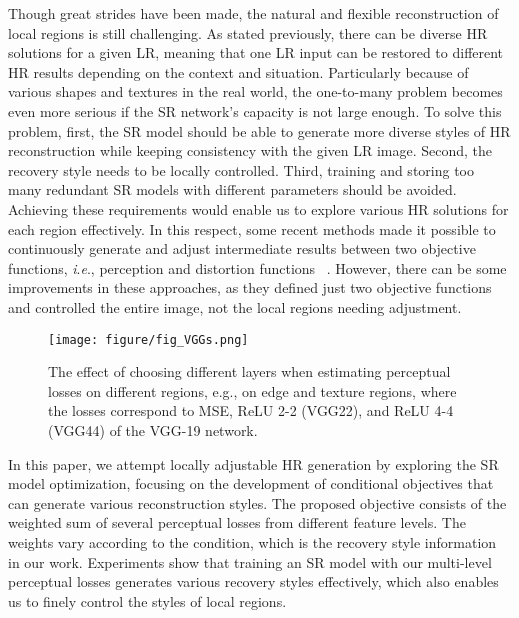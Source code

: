 \documentclass{article}
\newcommand{\ie}{\textit{i}.\textit{e}., }
\begin{document}
Though great strides have been made, the natural and flexible reconstruction of local regions is still challenging. As stated previously, there can be diverse HR solutions for a given LR, meaning that one LR input can be restored to different HR results depending on the context and situation. Particularly because of various shapes and textures in the real world, the one-to-many problem becomes even more serious if the SR network's capacity is not large enough.
To solve this problem, first, the SR model should be able to generate more diverse styles of HR reconstruction while keeping consistency with the given LR image. Second, the recovery style needs to be locally controlled. Third, training and storing too many redundant SR models with different parameters should be avoided. Achieving these requirements would enable us to explore various HR solutions for each region effectively. In this respect, some recent methods made it possible to continuously generate and adjust intermediate results between two objective functions, \ie perception and distortion functions ~\cite{wang2019cfsnet, wang2019deep, shoshan2019dynamic}. However, there can be some improvements in these approaches, as they defined just two objective functions and controlled the entire image, not the local regions needing adjustment.



\begin{figure*}[!t]
  \centering
\begin{minipage}[t]{1.0\linewidth}
  \centerline{\texttt{[image: figure/fig\_VGGs.png]}}
\end{minipage}
\caption{The effect of choosing different layers when estimating perceptual losses on different regions, e.g., on edge and texture regions, where the losses correspond to MSE, ReLU 2-2 (VGG22), and ReLU 4-4 (VGG44) of the VGG-19 network.}
\label{fig:f03}
\end{figure*}


In this paper, we attempt locally adjustable HR generation by exploring the SR model optimization, focusing on the development of conditional objectives that can generate various reconstruction styles. The proposed objective consists of the weighted sum of several perceptual losses from different feature levels. The weights vary according to the condition, which is the recovery style information in our work. Experiments show that training an SR model with our multi-level perceptual losses generates various recovery styles effectively, which also enables us to finely control the styles of local regions.
\end{document}
